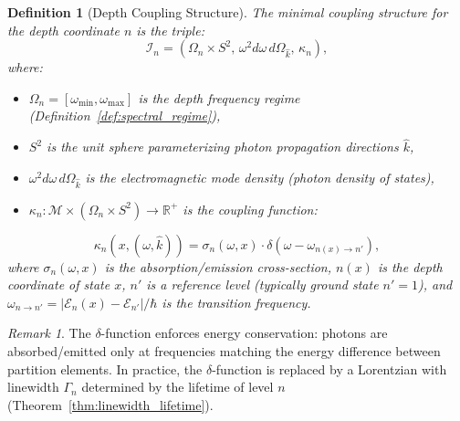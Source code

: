 \documentclass[twocolumn,10pt,a4paper]{article}
\newtheorem{definition}[theorem]{Definition}
\theoremstyle{remark}
\newtheorem{remark}[theorem]{Remark}
\newcommand{\manifold}{\mathcal{M}}
\newcommand{\Reals}{\mathbb{R}}
\begin{document}
\begin{definition}[Depth Coupling Structure]
\label{def:depth_coupling}
The minimal coupling structure for the depth coordinate $n$ is the triple:
\begin{equation}
\mathcal{I}_n = \left( \Omega_n \times S^2, \, \omega^2 d\omega \, d\Omega_{\hat{k}}, \, \kappa_n \right),
\end{equation}
where:
\begin{itemize}[noitemsep]
    \item $\Omega_n = [\omega_{\min}, \omega_{\max}]$ is the depth frequency regime (Definition~\ref{def:spectral_regime}),
    \item $S^2$ is the unit sphere parameterizing photon propagation directions $\hat{k}$,
    \item $\omega^2 d\omega \, d\Omega_{\hat{k}}$ is the electromagnetic mode density (photon density of states),
    \item $\kappa_n: \manifold \times (\Omega_n \times S^2) \to \Reals^+$ is the coupling function:
\end{itemize}
\begin{equation}
\kappa_n(x, (\omega, \hat{k})) = \sigma_n(\omega, x) \cdot \delta(\omega - \omega_{n(x) \to n'}),
\end{equation}
where $\sigma_n(\omega, x)$ is the absorption/emission cross-section, $n(x)$ is the depth coordinate of state $x$, $n'$ is a reference level (typically ground state $n' = 1$), and $\omega_{n \to n'} = |\mathcal{E}_n(x) - \mathcal{E}_{n'}|/\hbar$ is the transition frequency.
\end{definition}

\begin{remark}
The $\delta$-function enforces energy conservation: photons are absorbed/emitted only at frequencies matching the energy difference between partition elements. In practice, the $\delta$-function is replaced by a Lorentzian with linewidth $\Gamma_n$ determined by the lifetime of level $n$ (Theorem~\ref{thm:linewidth_lifetime}).
\end{remark}
\end{document}
